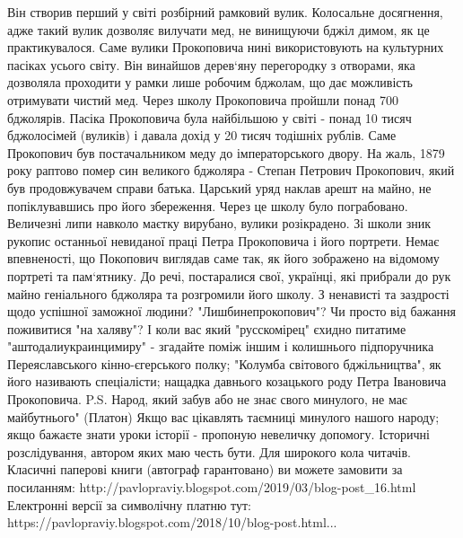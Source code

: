 Він створив перший у світі розбірний рамковий вулик. Колосальне досягнення, адже такий вулик дозволяє вилучати мед, не винищуючи бджіл димом, як це практикувалося. Саме вулики Прокоповича нині використовують на культурних пасіках усього світу. 
Він винайшов дерев`яну перегородку з отворами, яка дозволяла проходити у рамки лише робочим бджолам, що дає можливість отримувати чистий мед.
Через школу Прокоповича пройшли понад 700 бджолярів.
Пасіка Прокоповича була найбільшою у світі - понад 10 тисяч бджолосімей (вуликів) і давала дохід у 20 тисяч тодішніх рублів. Саме Прокопович був постачальником меду до імператорського двору.
На жаль, 1879 року раптово помер син великого бджоляра - Степан Петрович Прокопович, який був продовжувачем справи батька. Царський уряд наклав арешт на майно, не попіклувавшись про  його збереження. 
Через це школу було пограбовано. Величезні липи навколо маєтку вирубано, вулики розікрадено. Зі школи зник рукопис останньої невиданої праці Петра Прокоповича і його портрети. Немає впевненості, що Покопович виглядав саме так, як його зображено на відомому портреті та пам`ятнику.
До речі, постаралися свої, українці, які прибрали до рук майно геніального бджоляра та розгромили його школу. З ненависті та заздрості щодо успішної заможної людини? "Лишбинепрокопович"? Чи просто від бажання поживитися "на халяву"?
І коли вас який "русскомірец" єхидно питатиме "аштодалиукраинцимиру" - згадайте поміж іншим і колишнього підпоручника Переяславського кінно-єгерського полку; "Колумба світового бджільництва", як його називають спеціалісти; нащадка давнього козацького роду Петра Івановича Прокоповича.
P.S.
Народ, який забув або не знає свого минулого, не має майбутнього" (Платон)
Якщо вас цікавлять таємниці минулого нашого народу; якщо бажаєте знати уроки історії - пропоную невеличку допомогу. Історичні розслідування, автором яких маю честь бути. Для широкого кола читачів.
Класичні паперові книги (автограф гарантовано) ви можете замовити за посиланням: http://pavlopraviy.blogspot.com/2019/03/blog-post_16.html
Електронні версії за символічну платню тут: https://pavlopraviy.blogspot.com/2018/10/blog-post.html...
